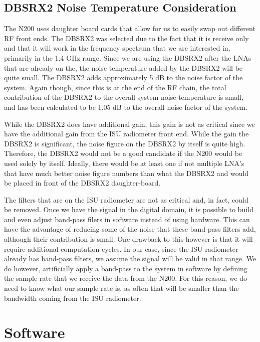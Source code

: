 \subsection{DBSRX2 Noise Temperature Consideration}

The N200 uses daughter board cards that allow for us to easily swap out different RF front ends.  The DBSRX2 was selected due to the fact that it is receive only and that it will work in the frequency spectrum that we are interested in, primarily in the 1.4 GHz range.  Since we are using the DBSRX2 after the LNAs that are already on the, the noise temperature added by the DBSRX2 will be quite small.  The DBSRX2 adds approximately 5 dB to the noise factor of the system.  Again though, since this is at the end of the RF chain, the total contribution of the DBSRX2 to the overall system noise temperature is small, and has been calculated to be 1.05 dB to the overall noise factor of the system.

While the DBSRX2 does have additional gain, this gain is not as critical since we have the additional gain from the ISU radiometer front end.  While the gain the DBSRX2 is significant, the noise figure on the DBSRX2 by itself is quite high.  Therefore, the DBSRX2 would not be a good candidate if the N200 would be used solely by itself.  Ideally, there would be at least one if not multiple LNA's that have much better noise figure numbers than what the DBSRX2 and would be placed in front of the DBSRX2 daughter-board.  

The filters that are on the ISU radiometer are not as critical and, in fact, could be removed.  Once we have the signal in the digital domain, it is possible to build and even adjust band-pass filers in software instead of using hardware. This can have the advantage of reducing some of the noise that these band-pass filters add, although their contribution is small.  One drawback to this however is that it will require additional computation cycles.  In our case, since the ISU radiometer already has band-pass filters, we assume the signal will be valid in that range.  We do however, artificially apply a band-pass to the system in software by defining the sample rate that we receive the data from the N200.  For this reason, we do need to know what our sample rate is, as often that will be smaller than the bandwidth coming from the ISU radiometer. 

\section{Software}

